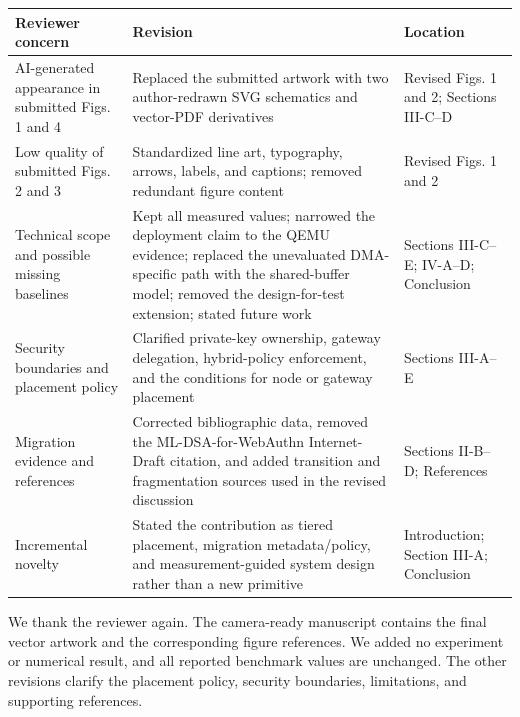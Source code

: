 \documentclass[10pt,letterpaper]{article}
\begin{document}
\footnotesize
\renewcommand{\arraystretch}{1.08}
\begin{tabularx}{\textwidth}{@{}p{}Yp{0.24\textwidth}@{}}
\toprule
\textbf{Reviewer concern} & \textbf{Revision} & \textbf{Location} \\
\midrule
AI-generated appearance in submitted Figs. 1 and 4 & Replaced the submitted artwork with two author-redrawn SVG schematics and vector-PDF derivatives & Revised Figs. 1 and 2; Sections III-C--D \\
Low quality of submitted Figs. 2 and 3 & Standardized line art, typography, arrows, labels, and captions; removed redundant figure content & Revised Figs. 1 and 2 \\
Technical scope and possible missing baselines & Kept all measured values; narrowed the deployment claim to the QEMU evidence; replaced the unevaluated DMA-specific path with the shared-buffer model; removed the design-for-test extension; stated future work & Sections III-C--E; IV-A--D; Conclusion \\
Security boundaries and placement policy & Clarified private-key ownership, gateway delegation, hybrid-policy enforcement, and the conditions for node or gateway placement & Sections III-A--E \\
Migration evidence and references & Corrected bibliographic data, removed the ML-DSA-for-WebAuthn Internet-Draft citation, and added transition and fragmentation sources used in the revised discussion & Sections II-B--D; References \\
Incremental novelty & Stated the contribution as tiered placement, migration metadata/policy, and measurement-guided system design rather than a new primitive & Introduction; Section III-A; Conclusion \\
\bottomrule
\end{tabularx}
\normalsize

\vspace{0.6em}
We thank the reviewer again. The camera-ready manuscript contains the final vector artwork and the corresponding figure references. We added no experiment or numerical result, and all reported benchmark values are unchanged. The other revisions clarify the placement policy, security boundaries, limitations, and supporting references.
\end{document}
